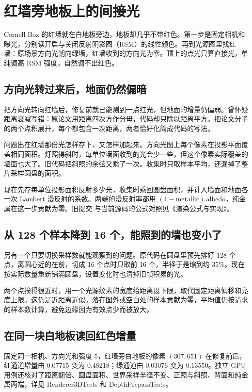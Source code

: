\section{红墙旁地板上的间接光}\label{sec:rsm-energy}
Cornell Box 的红墙就在白地板旁边，地板却几乎不带红色。第一步是固定相机和曝光，分别读开启与关闭反射阴影图（RSM）的线性颜色。再到光源图里找红墙：原场景方向光朝向绿墙，红墙收到的方向光为零。顶上的点光只算直接光，单纯调高 RSM 强度，自然调不出红色。

\subsection{方向光转过来后，地面仍然偏暗}
把方向光转向红墙后，修复前就已能测到一点红光，但地面的增量仍偏弱。曾怀疑距离衰减写错：原论文用距离四次方作分母，代码却只除以距离平方。把论文分子的两个点积展开，每个都包含一次距离，两者恰好化简成代码的写法。

问题出在红墙那份光怎样存下、又怎样加起来。方向光图上每个像素在投影平面覆盖相同面积。灯照得斜时，每单位墙面收到的光会少一些，但这个像素实际覆盖的墙面也大了。旧代码把斜照的余弦又乘了一次。收集时只取样本平均，还漏掉了整片采样圆盘的面积。

现在先存每单位投影面积反射多少光，收集时乘回圆盘面积，并计入墙面和地面各一次 Lambert 漫反射的系数。两端的漫反射率都用 $(1-\text{metallic})\,\text{albedo}$，纯金属在这一步贡献为零。旧提交  与当前源码的公式对照见《渲染公式与实现》。

\subsection{从 128 个样本降到 16 个，能照到的墙也变小了}
另有一个只要切换采样数就能观察到的问题。原代码在圆盘里预先排好 128 个点，离圆心近的在前，切成 16 个点时只取前 16 个，半径于是缩到约 35\%。现在按实际数量重新铺满圆盘，设置变化时也清掉旧帧积累的光。

两个点挨得很近时，用一个光源纹素的宽度给距离设下限，取代固定距离偏移和亮度上限。这仍是近距离近似。落在图外或空白处的样本贡献为零，平均值仍按请求的样本数计算，避免边缘因为有效点少而被放大。

\subsection{在同一块白地板读回红色增量}
固定同一相机、方向光和强度 5，红墙旁白地板的像素 $(307,651)$ 在修复前后，红通道增量由 0.07715 变为 0.48218；绿通道由 0.03076 变为 0.13550。独立 GPU 用例还核对了距离翻倍、圆盘面积、世界采样半径不变、正照与斜照、背面和纯金属两端，详见 Renderer3DTests 和 DepthPrepassTests。

